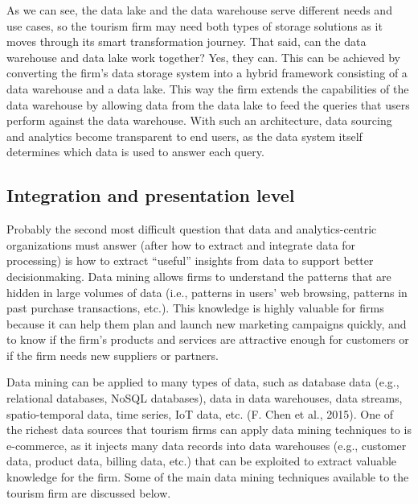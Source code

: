 \documentclass[
  letterpaper,
  DIV=11,
  numbers=noendperiod]{scrreprt}
\begin{document}
As we can see, the data lake and the data warehouse serve different
needs and use cases, so the tourism firm may need both types of storage
solutions as it moves through its smart transformation journey. That
said, can the data warehouse and data lake work together? Yes, they can.
This can be achieved by converting the firm's data storage system into a
hybrid framework consisting of a data warehouse and a data lake. This
way the firm extends the capabilities of the data warehouse by allowing
data from the data lake to feed the queries that users perform against
the data warehouse. With such an architecture, data sourcing and
analytics become transparent to end users, as the data system itself
determines which data is used to answer each query.

\hypertarget{integration-and-presentation-level}{%
\subsection{Integration and presentation
level}\label{integration-and-presentation-level}}

Probably the second most difficult question that data and
analytics-centric organizations must answer (after how to extract and
integrate data for processing) is how to extract ``useful'' insights
from data to support better decisionmaking. Data mining allows firms to
understand the patterns that are hidden in large volumes of data (i.e.,
patterns in users' web browsing, patterns in past purchase transactions,
etc.). This knowledge is highly valuable for firms because it can help
them plan and launch new marketing campaigns quickly, and to know if the
firm's products and services are attractive enough for customers or if
the firm needs new suppliers or partners.

Data mining can be applied to many types of data, such as database data
(e.g., relational databases, NoSQL databases), data in data warehouses,
data streams, spatio-temporal data, time series, IoT data, etc. (F. Chen
et al., 2015). One of the richest data sources that tourism firms can
apply data mining techniques to is e-commerce, as it injects many data
records into data warehouses (e.g., customer data, product data, billing
data, etc.) that can be exploited to extract valuable knowledge for the
firm. Some of the main data mining techniques available to the tourism
firm are discussed below.
\end{document}
